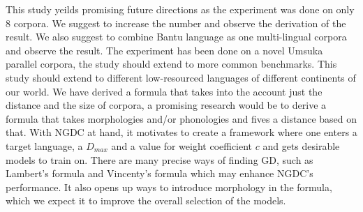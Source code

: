 \documentclass[11pt]{article}
\begin{document}
This study yeilds promising future directions as the experiment was done on only 8 corpora. We suggest to increase the number and observe the derivation of the result. We also suggest to combine Bantu language as one multi-lingual corpora and observe the result. The experiment has been done on a novel Umsuka parallel corpora, the study should extend to more common benchmarks. This study should extend to different low-resourced languages of different continents of our world. We have derived a formula that takes into the account just the distance and the size of corpora, a promising research would be to derive a formula that takes morphologies and/or phonologies and fives a distance based on that. With NGDC at hand, it motivates to create a framework where one enters a target language, a $D_{max}$ and a value for weight coefficient $c$ and gets desirable models to train on. There are many precise ways of finding GD, such as Lambert's formula \citep{lambert1942distance} and Vincenty's formula \citep{vincenty1975direct} which may enhance NGDC's performance. It also opens up ways to introduce morphology in the formula, which we expect it to improve the overall selection of the models.





\end{document}
